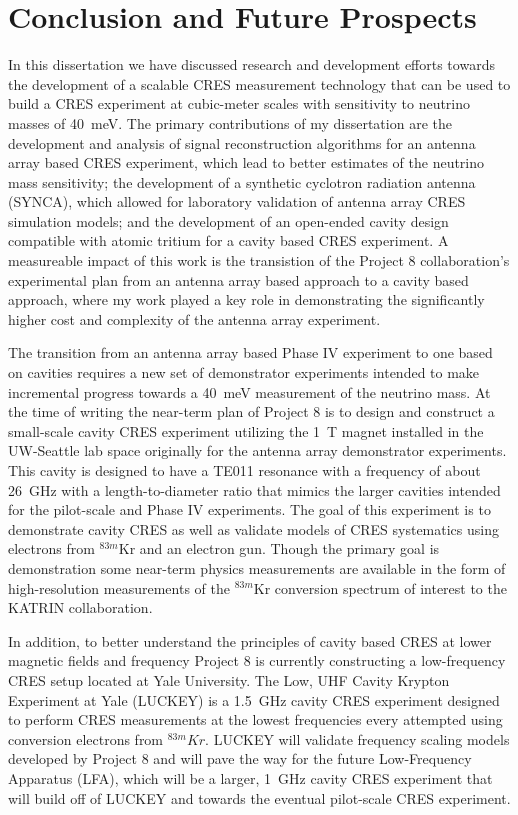 
\chapter{Conclusion and Future Prospects}

In this dissertation we have discussed research and development efforts towards the development of a scalable CRES measurement technology that can be used to build a CRES experiment at cubic-meter scales with sensitivity to neutrino masses of 40~meV. The primary contributions of my dissertation are the development and analysis of signal reconstruction algorithms for an antenna array based CRES experiment, which lead to better estimates of the neutrino mass sensitivity; the development of a synthetic cyclotron radiation antenna (SYNCA), which allowed for laboratory validation of antenna array CRES simulation models; and the development of an open-ended cavity design compatible with atomic tritium for a cavity based CRES experiment. A measureable impact of this work is the transistion of the Project 8 collaboration's experimental plan from an antenna array based approach to a cavity based approach, where my work played a key role in demonstrating the significantly higher cost and complexity of the antenna array experiment.

The transition from an antenna array based Phase IV experiment to one based on cavities requires a new set of demonstrator experiments intended to make incremental progress towards a 40~meV measurement of the neutrino mass. At the time of writing the near-term plan of Project 8 is to design and construct a small-scale cavity CRES experiment utilizing the 1~T magnet installed in the UW-Seattle lab space originally for the antenna array demonstrator experiments. This cavity is designed to have a TE011 resonance with a frequency of about 26~GHz with a length-to-diameter ratio that mimics the larger cavities intended for the pilot-scale and Phase IV experiments. The goal of this experiment is to demonstrate cavity CRES as well as validate models of CRES systematics using electrons from $^{83m}$Kr and an electron gun. Though the primary goal is demonstration some near-term physics measurements are available in the form of high-resolution measurements of the $^{83m}$Kr conversion spectrum of interest to the KATRIN collaboration.

In addition, to better understand the principles of cavity based CRES at lower magnetic fields and frequency Project 8 is currently constructing a low-frequency CRES setup located at Yale University. The Low, UHF Cavity Krypton Experiment at Yale (LUCKEY) is a 1.5~GHz cavity CRES experiment designed to perform CRES measurements at the lowest frequencies every attempted using conversion electrons from $^{83m}Kr$. LUCKEY will validate frequency scaling models developed by Project 8 and will pave the way for the future Low-Frequency Apparatus (LFA), which will be a larger, 1~GHz cavity CRES experiment that will build off of LUCKEY and towards the eventual pilot-scale CRES experiment.

